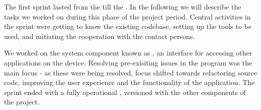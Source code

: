 The first sprint lasted from the  till the .
In the following we will describe the tasks we worked on during this phase of the project period. 
Central activities in the sprint were getting to know the existing codebase, setting up the tools to be used, and initiating the cooperation with the contact persons.

We worked on the system component known as \textit{\launcher}, an interface for accessing other \giraf applications on the device.
Resolving pre-exisiting issues in the program was the main focus - as these were being resolved, focus shifted towards refactoring source code, improving the user experience and the functionality of the application.
The sprint ended with a fully operational \launcher, versioned with the other components of the project.